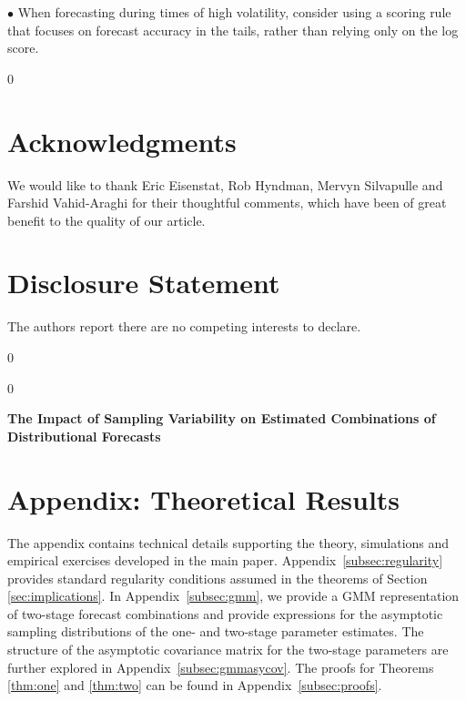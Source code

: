 \documentclass[12pt]{article}
\newcommand{\blind}{0}
\theoremstyle{definition}
\theoremstyle{remark}
\renewcommand{\appendixname}{Appendix}
\begin{document}
\smallskip 

\noindent $\bullet$ When forecasting during times of high volatility, consider using a scoring rule that focuses on forecast accuracy in the tails, rather than relying only on the log score.

\blind
{
\section*{Acknowledgments}
We would like to thank Eric Eisenstat, Rob Hyndman, Mervyn Silvapulle and Farshid Vahid-Araghi for their thoughtful comments, which have been of great benefit to the quality of our article.

\section*{Disclosure Statement}
The authors report there are no competing interests to declare.
}\fi

{
\footnotesize


}

\newpage


\blind
{
  \setcounter{footnote}{0}
  \renewcommand{\thefootnote}{\fnsymbol{footnote}}
  \maketitle
  \footnotetext[1]{\funding}
  \footnotetext[2]{\ebsaffiliation}
  \footnotetext[3]{\mdaffiliation}
  \footnotetext[4]{\correspondingauthor}
  \renewcommand{\thefootnote}{\arabic{footnote}}
} \fi

\blind
{
  \bigskip
  \bigskip
  \bigskip
  \begin{center}
    {\Large\bf The Impact of Sampling Variability on Estimated Combinations of Distributional Forecasts}
  \end{center}
  \smallskip
} \fi

\appendix

\section*{\centering Appendix: Theoretical Results}
\setcounter{section}{1}

The appendix contains technical details supporting the theory, simulations and empirical exercises developed in the main paper. \appendixname\ \ref{subsec:regularity} provides standard regularity conditions assumed in the theorems of Section \ref{sec:implications}. In \appendixname\ \ref{subsec:gmm}, we provide a GMM representation of two-stage forecast combinations and provide expressions for the asymptotic sampling distributions of the one- and two-stage parameter estimates. The structure of the asymptotic covariance matrix for the two-stage parameters are further explored in \appendixname\ \ref{subsec:gmmasycov}. The proofs for Theorems \ref{thm:one} and \ref{thm:two} can be found in \appendixname\ \ref{subsec:proofs}.
\end{document}
